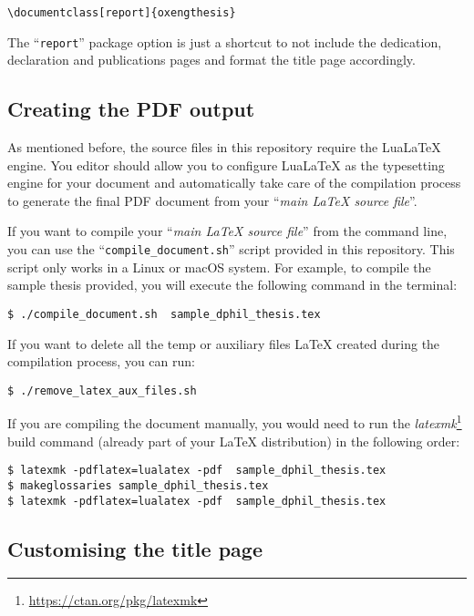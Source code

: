 \begin{lstlisting}[style=custom-latex]
\documentclass[report]{oxengthesis}
\end{lstlisting}

The ``\verb|report|'' package option is just a shortcut to not include the dedication, declaration and publications pages and format the title page accordingly.


\subsection{Creating the PDF output}


As mentioned before, the source files in this repository require the LuaLaTeX engine. You editor should allow you to configure LuaLaTeX as the typesetting engine for your document and automatically take care of the compilation process to generate the final PDF document from your ``\textit{main LaTeX source file}''.

If you want to compile your ``\textit{main LaTeX source file}'' from the command line, you can use the ``\verb|compile_document.sh|'' script provided in this repository. This script only works in a Linux or macOS system. For example, to compile the sample thesis provided, you will execute the following command in the terminal:


\begin{lstlisting}[style=custom-bash]
$ ./compile_document.sh  sample_dphil_thesis.tex
\end{lstlisting}

If you want to delete all the temp or auxiliary files LaTeX created during the compilation process, you can run:

\begin{lstlisting}[style=custom-bash]
$ ./remove_latex_aux_files.sh
\end{lstlisting}


If you are compiling the document manually, you would need to run the \textit{latexmk}\footnote{\url{https://ctan.org/pkg/latexmk}} build command (already part of your LaTeX distribution) in the following order:

\begin{lstlisting}[style=custom-bash]
$ latexmk -pdflatex=lualatex -pdf  sample_dphil_thesis.tex
$ makeglossaries sample_dphil_thesis.tex
$ latexmk -pdflatex=lualatex -pdf  sample_dphil_thesis.tex
\end{lstlisting}


\subsection{Customising the title page}


